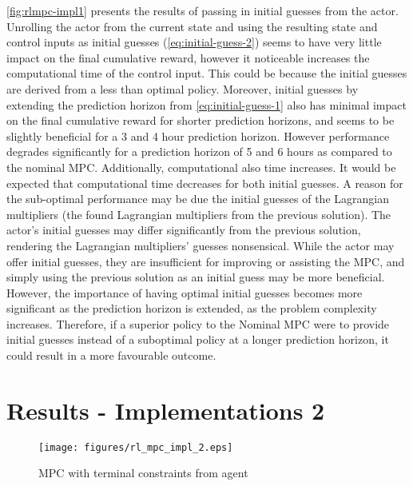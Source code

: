 \autoref{fig:rlmpc-impl1} presents the results of passing in initial guesses from the actor. Unrolling the actor from the current state and using the resulting state and control inputs as initial guesses (\autoref{eq:initial-guess-2}) seems to have very little impact on the final cumulative reward, however it noticeable increases the computational time of the control input. This could be because the initial guesses are derived from a less than optimal policy. Moreover, initial guesses by extending the prediction horizon from \autoref{eq:initial-guess-1} also has minimal impact on the final cumulative reward for shorter prediction horizons, and seems to be slightly beneficial for a 3 and 4 hour prediction horizon. However performance degrades significantly for a prediction horizon of 5 and 6 hours as compared to the nominal MPC. Additionally, computational also time increases. It would be expected that computational time decreases for both initial guesses. A reason for the sub-optimal performance may be due the initial guesses of the Lagrangian multipliers (the found Lagrangian multipliers from the previous solution). The actor's initial guesses may differ significantly from the previous solution, rendering the Lagrangian multipliers' guesses nonsensical. While the actor may offer initial guesses, they are insufficient for improving or assisting the MPC, and simply using the previous solution as an initial guess may be more beneficial. However, the importance of having optimal initial guesses becomes more significant as the prediction horizon is extended, as the problem complexity increases. Therefore, if a superior policy to the Nominal MPC were to provide initial guesses instead of a suboptimal policy at a longer prediction horizon, it could result in a more favourable outcome.

\section{Results - Implementations 2}

\begin{figure}[H]
	\centering
	\texttt{[image: figures/rl\_mpc\_impl\_2.eps]}
	\caption{MPC with terminal constraints from agent}
	\label{fig:rlmpc-impl2}
\end{figure}

